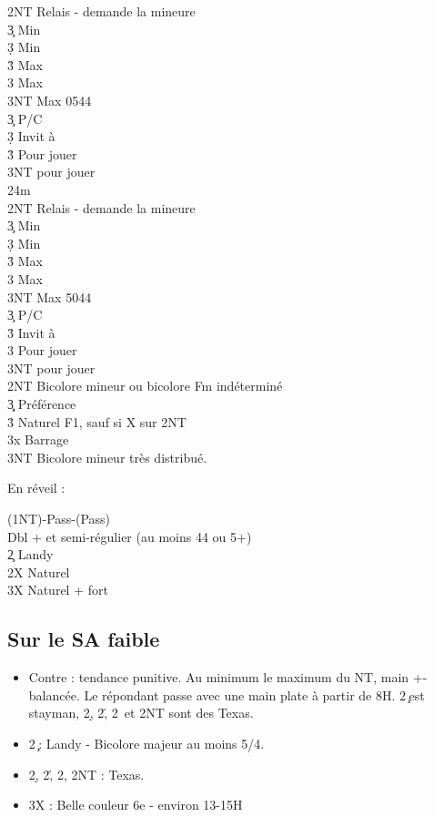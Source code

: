 \documentclass[a4paper]{article}
\begin{document}
\begin{bidtable}
2NT \> Relais - demande la mineure\+\\
3\c \> Min \c \\
3\d \> Min \d \\
3\h \> Max \c \\
3\s \> Max \d \\
3NT \> Max 0544\-\\
3\c \> P/C\\
3\d \> Invit à \h \\
3\h \> Pour jouer\\
3NT \> pour jouer\-\\
2\s {}\s 4m\+\\
2NT \> Relais - demande la mineure\+\\
3\c \> Min \c \\
3\d \> Min \d \\
3\h \> Max \c \\
3\s \> Max \d \\
3NT \> Max 5044\-\\
3\c \> P/C\\
3\h \> Invit à \s \\
3\s \> Pour jouer\\
3NT \> pour jouer\-\\
2NT \> Bicolore mineur ou bicolore Fm indéterminé\+\\
3\c\d \> Préférence\\
3\h\s \> Naturel F1, sauf si X sur 2NT\-\\
3x \> Barrage\\
3NT \> Bicolore mineur très distribué.\-
\end{bidtable}

En réveil :

\begin{bidtable}
(1NT)-Pass-(Pass)\+\\
Dbl + et semi-régulier (au moins 44 ou 5+)\\
2\c \> Landy\\
2X \> Naturel\\
3X \> Naturel + fort\-
\end{bidtable}

\subsection{Sur le SA faible}

\begin{itemize}
\item Contre : tendance punitive. Au minimum le maximum du NT, main +- balancée. Le répondant passe avec une main plate à partir de 8H.
    2\c\ est stayman, 2\d , 2\h , 2\s\ et 2NT sont des Texas.

\item 2\c\ : Landy - Bicolore majeur au moins 5/4.

\item 2\d , 2\h , 2\s , 2NT : Texas.

\item 3X : Belle couleur 6e - environ 13-15H

\end{itemize}
\end{document}
